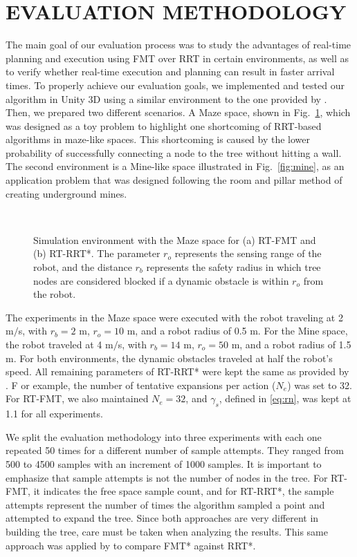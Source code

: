 \section{EVALUATION METHODOLOGY}
\label{sec:methodology}
The main goal of our evaluation process was to study the advantages of real-time planning and execution using FMT over RRT in certain environments, as well as to verify whether real-time execution and planning can result in faster arrival times. To properly achieve our evaluation goals, we implemented and tested our algorithm in Unity 3D using a similar environment to the one provided by \cite{naderi2015rt}. Then, we prepared two different scenarios. A Maze space, shown in Fig.~\ref{fig:maze}, which was designed as a toy problem to highlight one shortcoming of RRT-based algorithms in maze-like spaces. This shortcoming is caused by the lower probability of successfully connecting a node to the tree without hitting a wall. The second environment is a Mine-like space illustrated in Fig.~\ref{fig:mine}, as an application problem that was designed following the room and pillar method of creating underground mines.

\begin{figure}
\centerline{
\\
}
\caption{Simulation environment with the Maze space for (a) RT-FMT and (b) RT-RRT*. The parameter $r_o$ represents the sensing range of the robot, and the distance $r_b$ represents the safety radius in which tree nodes are considered blocked if a dynamic obstacle is within $r_o$ from the robot.}
\label{fig:maze}
\end{figure}

The experiments in the Maze space were executed with the robot traveling at 2 m$/$s, with $r_b = 2$ m, $r_o = 10$ m, and a robot radius of 0.5 m. For the Mine space, the robot traveled at 4 m$/$s, with $r_b = 14$ m, $r_o = 50$ m, and a robot radius of 1.5 m. For both environments, the dynamic obstacles traveled at half the robot's speed. All remaining parameters of RT-RRT* were kept the same as provided by \cite{naderi2015rt}. F or example, the number of tentative expansions per action ($N_e$) was set to 32. For RT-FMT, we also maintained  $N_e = 32$, and $\gamma_s$, defined in \eqref{eq:rn}, was kept at 1.1 for all experiments.

We split the evaluation methodology into three experiments with each one repeated 50 times for a different number of sample attempts. They ranged from 500 to 4500 samples with an increment of 1000 samples. It is important to emphasize that sample attempts is not the number of nodes in the tree. For RT-FMT, it indicates the free space sample count, and for RT-RRT*, the sample attempts represent the number of times the algorithm sampled a point and attempted to expand the tree. Since both approaches are very different in building the tree, care must be taken when analyzing the results. This same approach was applied by \cite{fmt} to compare FMT* against RRT*.


